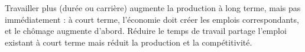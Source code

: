 \begin{resultat}
Travailler plus (durée ou carrière) augmente la production à long terme, mais pas immédiatement : à court terme,
l'économie doit créer les emplois correspondants, et le chômage augmente d'abord. Réduire le temps de travail partage
l'emploi existant à court terme mais réduit la production et la compétitivité.
\end{resultat}
